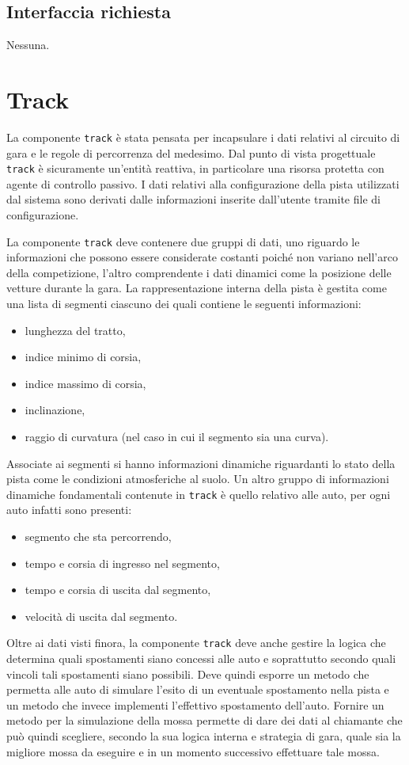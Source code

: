 \subsection*{Interfaccia richiesta}
Nessuna.

\section{Track}
La componente \texttt{track} è stata pensata per incapsulare i dati relativi al circuito di gara e le regole di percorrenza del medesimo. Dal punto di vista progettuale \texttt{track} è sicuramente un'entità reattiva, in particolare una risorsa protetta con agente di controllo passivo.
I dati relativi alla configurazione della pista utilizzati dal sistema sono derivati dalle informazioni inserite dall'utente tramite file di configurazione.

La componente \texttt{track} deve contenere due gruppi di dati, uno riguardo le informazioni che possono essere considerate costanti poiché non variano nell'arco della competizione, l'altro comprendente i dati dinamici come la posizione delle vetture durante la gara.
La rappresentazione interna della pista è gestita come una lista di segmenti ciascuno dei quali contiene le seguenti informazioni:
\begin{itemize}
\item lunghezza del tratto,
\item indice minimo di corsia,
\item indice massimo di corsia,
\item inclinazione,
\item raggio di curvatura (nel caso in cui il segmento sia una curva).
\end{itemize}
Associate ai segmenti si hanno informazioni dinamiche riguardanti lo stato della pista come le condizioni atmosferiche al suolo.
Un altro gruppo di informazioni dinamiche fondamentali contenute in \texttt{track} è quello relativo alle auto, per ogni auto infatti sono presenti:
\begin{itemize}
\item segmento che sta percorrendo,
\item tempo e corsia di ingresso nel segmento,
\item tempo e corsia di uscita dal segmento,
\item velocità di uscita dal segmento.
\end{itemize}

Oltre ai dati visti finora, la componente \texttt{track} deve anche gestire la logica che determina quali spostamenti siano concessi alle auto e soprattutto secondo quali vincoli tali spostamenti siano possibili. Deve quindi esporre un metodo che permetta alle auto di simulare l'esito di un eventuale spostamento nella pista e un metodo che invece implementi l'effettivo spostamento dell'auto. Fornire un metodo per la simulazione della mossa permette di dare dei dati al chiamante che può quindi scegliere, secondo la sua logica interna e strategia di gara, quale sia la migliore mossa da eseguire e in un momento successivo effettuare tale mossa.

